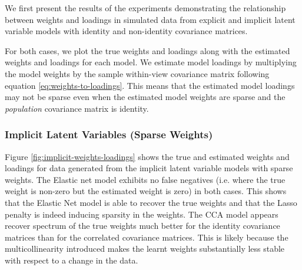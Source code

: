 We first present the results of the experiments demonstrating the relationship between weights and \gls{loadings} in simulated data from explicit and implicit latent variable models with identity and non-identity covariance matrices.

For both cases, we plot the true weights and loadings along with the estimated weights and loadings for each model.
We estimate model loadings by multiplying the model weights by the sample within-view covariance matrix following equation \ref{eq:weights-to-loadings}.
This means that the estimated model loadings may not be sparse even when the estimated model weights are sparse and the \textit{population} covariance matrix is identity.

\subsubsection{Implicit Latent Variables (Sparse Weights)}

Figure \ref{fig:implicit-weights-loadings} shows the true and estimated weights and \gls{loadings} for data generated from the implicit latent variable models with sparse weights.
The Elastic net model exhibits no false negatives (i.e. where the true weight is non-zero but the estimated weight is zero) in both cases.
This shows that the Elastic Net model is able to recover the true weights and that the Lasso penalty is indeed inducing sparsity in the weights.
The CCA model appears recover spectrum of the true weights much better for the identity covariance matrices than for the correlated covariance matrices.
This is likely because the multicollinearity introduced makes the learnt weights substantially less stable with respect to a change in the data.

